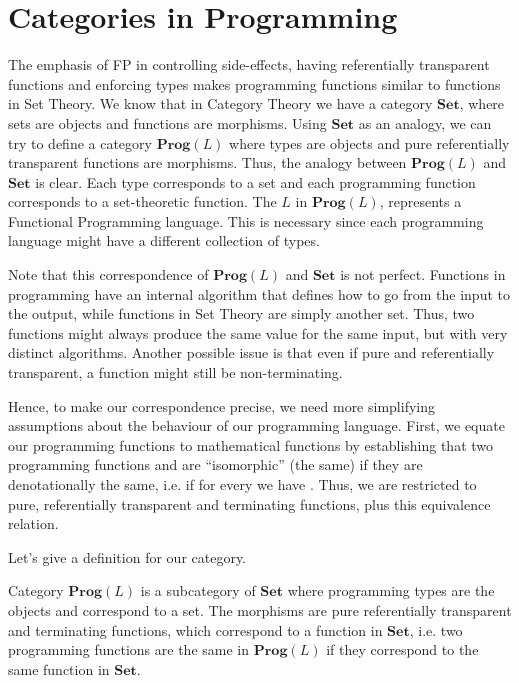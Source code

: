 \section{Categories in Programming}

The emphasis of FP in controlling side-effects,
having referentially transparent functions and enforcing types
makes programming functions similar to functions in Set Theory.
We know that in Category Theory we have a category $\mathbf{Set}$,
where sets are objects and functions are morphisms. Using $\mathbf{Set}$
as an analogy, we can try to define a category $\mathbf{Prog}(L)$ where
types are objects and pure referentially transparent functions are morphisms.
Thus, the analogy between $\mathbf{Prog}(L)$ and $\mathbf{Set}$ is clear.
Each type corresponds to a set and each programming function corresponds to a set-theoretic function.
The $L$ in $\mathbf{Prog}(L)$, represents a Functional Programming language.
This is necessary since each programming language
might have a different collection of types.

Note that this correspondence of $\mathbf{Prog}(L)$ and $\mathbf{Set}$ is not perfect.
Functions in programming have an internal algorithm that defines how to
go from the input to the output, while functions in Set Theory are simply another set.
Thus, two functions might always produce the same value for the same input, but with
very distinct algorithms. Another possible issue is that even if pure and referentially transparent,
a function might still be non-terminating.

Hence, to make our correspondence precise, we need more simplifying assumptions
about the behaviour of our programming language. First, we equate our programming functions
to mathematical functions by establishing that two programming functions
 and  are ``isomorphic'' (the same) if they are denotationally the same,
i.e. if for every  we have . Thus, we are restricted
to pure, referentially transparent and terminating functions, plus this equivalence relation.

Let's give a definition for our category.
\begin{definition}
	Category $\mathbf{Prog}(L)$ is a subcategory of $\mathbf{Set}$ where programming
	types are the objects and correspond to a set. The morphisms are pure
	referentially transparent and terminating functions, which correspond to
	a function in $\mathbf{Set}$, i.e. two programming functions are the same
	in $\mathbf{Prog}(L)$ if they correspond to the same function in $\mathbf{Set}$.
\end{definition}

